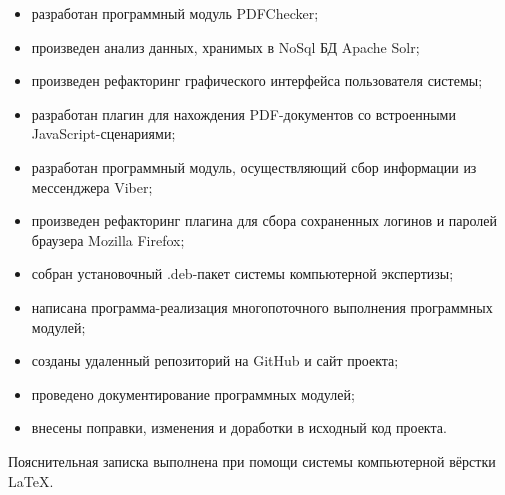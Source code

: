 \begin{itemize}
  \item разработан программный модуль PDFChecker;
  \item произведен анализ данных, хранимых в NoSql БД Apache Solr; 
  \item произведен рефакторинг графического интерфейса пользователя системы;
  \item разработан плагин для нахождения PDF-документов со встроенными JavaScript-сценариями;
  \item разработан программный модуль, осуществляющий сбор информации из мессенджера Viber;  
  \item произведен рефакторинг плагина для сбора сохраненных логинов и паролей браузера Mozilla Firefox;  
  \item собран установочный .deb-пакет системы компьютерной экспертизы;  
  \item написана программа-реализация многопоточного выполнения программных модулей; 
  \item созданы удаленный репозиторий на GitHub и сайт проекта;  
  \item проведено документирование программных модулей;
  \item внесены поправки, изменения и доработки в исходный код проекта.
\end{itemize}

Пояснительная записка выполнена при помощи системы компьютерной вёрстки \LaTeX.
